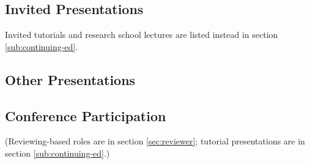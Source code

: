 \documentclass[10pt]{article}
\begin{document}
%

\subsection{Invited Presentations} %

Invited tutorials and research school lectures are listed instead in section \ref{sub:continuing-ed}.
{\color{white} \competitive\international\national\local\virtual\paid}

\begin{itemize}[leftmargin=5em]

\end{itemize}


\subsection{Other Presentations}

\begin{itemize}[leftmargin=5em]

\end{itemize}


%

\subsection{Conference Participation} %
\label{sec:conference-participation}

(Reviewing-based roles are in section \ref{sec:reviewer}; tutorial presentations are in section \ref{sub:continuing-ed}.)
\end{document}
